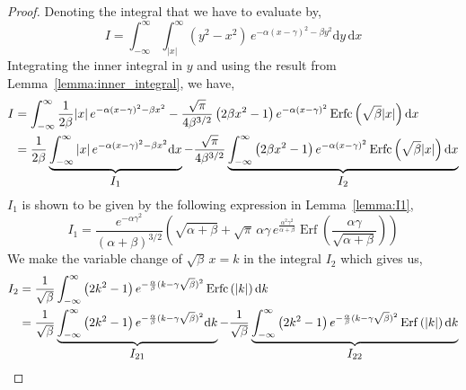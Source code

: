 \documentclass[journal]{IEEEtran}
\theoremstyle{plain}
\theoremstyle{definition}
\theoremstyle{remark}
\newcommand{\Erf}{\operatorname{Erf}}
\newcommand{\Erfc}{\operatorname{Erfc}}
\newcommand{\dd}{\mathrm{d}}
\begin{document}
\begin{proof}
Denoting the integral that we have to evaluate by,
\begin{equation}
    I = \int_{-\infty}^\infty \int_{|x|}^\infty (y^2-x^2) \, e^{-\alpha(x-\gamma)^2-\beta y^2} \dd y \, \dd x
\end{equation}
Integrating the inner integral in $y$ and using the result from Lemma~\ref{lemma:inner_integral}, we have,
\begin{equation}
\begin{split}
    I &= \int_{-\infty}^\infty \frac{1}{2 \beta}  |x|\, e^{ -\alpha (x - \gamma)^{2} -\beta x^{2}} - \frac{\sqrt{\pi}}{4 \beta^{3/2}} \left(2 \beta x^2 - 1\right) e^{ -\alpha (x - \gamma)^{2} } \Erfc\left(\sqrt{\beta}|x|\right) \dd x \\
    &= \frac{1}{2 \beta} \underbrace{\int_{-\infty}^\infty |x| \, e^{ -\alpha (x - \gamma)^{2} -\beta x^{2}} \dd x}_{\text{\normalsize \(I_1\)}}
    - \frac{\sqrt{\pi}}{4 \beta^{3/2}} \underbrace{\int_{-\infty}^\infty \left(2 \beta x^2 - 1\right) e^{ -\alpha (x - \gamma)^{2} } \Erfc\left(\sqrt{\beta}|x|\right) \dd x}_{\text{\normalsize \(I_2\)}}
\end{split} \label{eq:I_defn}
\end{equation}
$I_1$ is shown to be given by the following expression in Lemma~\ref{lemma:I1},
\begin{equation}
    I_1 = \frac{e^{-\alpha  \gamma ^2}}{(\alpha +\beta )^{3/2}} \left(\sqrt{\alpha +\beta } + \sqrt{\pi } \, \alpha  \gamma \, e^{\frac{\alpha ^2 \gamma ^2}{\alpha +\beta }} \Erf \left(\frac{\alpha  \gamma }{\sqrt{\alpha +\beta }}\right)\right)
\end{equation}
We make the variable change of $\sqrt{\beta}\, x = k$ in the integral $I_2$ which gives us,
\begin{equation}
\begin{split}
    I_2 &= \frac{1}{\sqrt{\beta}} \int_{-\infty}^\infty \left(2 k^2 - 1\right) e^{ -\frac{\alpha}{\beta} (k - \gamma\sqrt{\beta})^{2} } \Erfc\left(|k|\right) \dd k \\
    &= \frac{1}{\sqrt{\beta}} \underbrace{\int_{-\infty}^\infty \left(2 k^2 - 1\right) e^{ -\frac{\alpha}{\beta} (k - \gamma\sqrt{\beta})^{2}} \dd k}_{\text{\normalsize \(I_{21}\)}} - \frac{1}{\sqrt{\beta}} \underbrace{\int_{-\infty}^\infty \left(2 k^2 - 1\right) e^{ -\frac{\alpha}{\beta} (k - \gamma\sqrt{\beta})^{2} } \Erf\left(|k|\right) \dd k}_{\text{\normalsize \(I_{22}\)}}
\end{split} \label{eq:I2_defn}
\end{equation}

\end{proof}
\end{document}
